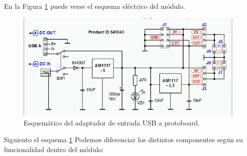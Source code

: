 En la Figura \ref{figura:alimentador_usb_protoboard_esquema} puede verse el esquema eléctrico del módulo.\\

\begin{figure}[H]
  \begin{center}
    \includegraphics[scale=0.5]{imagenes/esquema_alimentador_protoboard.png}
  \end{center}
  \caption{Esquemático del adaptador de entrada USB a protoboard.}
  \label{figura:alimentador_usb_protoboard_esquema}
\end{figure}

Siguiento el esquema \ref{figura:alimentador_usb_protoboard_esquema} Podemos diferenciar los distintos componentes según su funcionalidad dentro del módulo:

